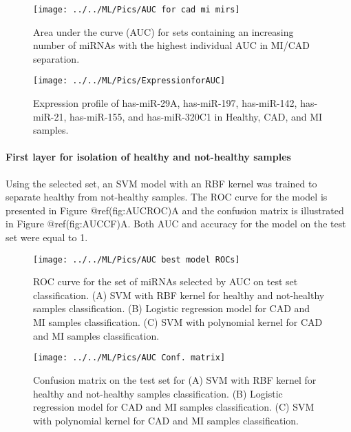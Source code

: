 \documentclass[smallextended]{svjour3}       %
\begin{document}
\begin{figure}

{\centering \texttt{[image: ../../ML/Pics/AUC for cad mi mirs]} 

}

\caption{Area under the curve (AUC) for sets containing an increasing number of miRNAs with the highest individual AUC in MI/CAD separation.}\label{fig:AUCset}
\end{figure}

\begin{figure}

{\centering \texttt{[image: ../../ML/Pics/ExpressionforAUC]} 

}

\caption{Expression profile of has-miR-29A, has-miR-197, has-miR-142, has-miR-21, has-miR-155, and has-miR-320C1 in Healthy, CAD, and MI samples.}\label{fig:AUCexp}
\end{figure}

\hypertarget{first-layer-for-isolation-of-healthy-and-not-healthy-samples-1}{%
\paragraph{First layer for isolation of healthy and not-healthy
samples}\label{first-layer-for-isolation-of-healthy-and-not-healthy-samples-1}}

Using the selected set, an SVM model with an RBF kernel was trained to
separate healthy from not-healthy samples. The ROC curve for the model
is presented in Figure @ref(fig:AUCROC)A and the confusion matrix is
illustrated in Figure @ref(fig:AUCCF)A. Both AUC and accuracy for the
model on the test set were equal to 1.

\begin{figure}

{\centering \texttt{[image: ../../ML/Pics/AUC best model ROCs]} 

}

\caption{ROC curve for the set of miRNAs selected by AUC on test set classification. (A) SVM with RBF kernel for healthy and not-healthy samples classification. (B) Logistic regression model for CAD and MI samples classification. (C) SVM with polynomial kernel for CAD and MI samples classification. }\label{fig:AUCROC}
\end{figure}

\begin{figure}

{\centering \texttt{[image: ../../ML/Pics/AUC Conf. matrix]} 

}

\caption{Confusion matrix on the test set for (A) SVM with RBF kernel for healthy and not-healthy samples classification. (B) Logistic regression model for CAD and MI samples classification. (C) SVM with polynomial kernel for CAD and MI samples classification.}\label{fig:AUCCF}
\end{figure}
\end{document}
